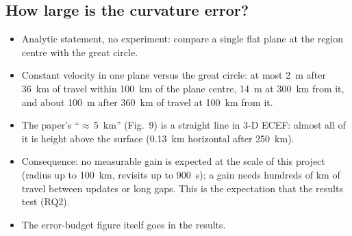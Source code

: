 \subsection{How large is the curvature error?}
\label{sec:nvector-error}
\begin{itemize}
    \item Analytic statement, no experiment: compare a single flat plane at the region centre with the great circle.
    \item Constant velocity in one plane versus the great circle: at most 2~m after 36~km of travel within 100~km of the plane centre, 14~m at 300~km from it, and about 100~m after 360~km of travel at 100~km from it.
    \item The paper's ``$\approx$\,5~km'' (Fig.~9) is a straight line in 3-D ECEF: almost all of it is height above the surface (0.13~km horizontal after 250~km).
    \item Consequence: no measurable gain is expected at the scale of this project (radius up to 100~km, revisits up to 900~s); a gain needs hundreds of km of travel between updates or long gaps. This is the expectation that the results test (RQ2).
    \item The error-budget figure itself goes in the results.
\end{itemize}
